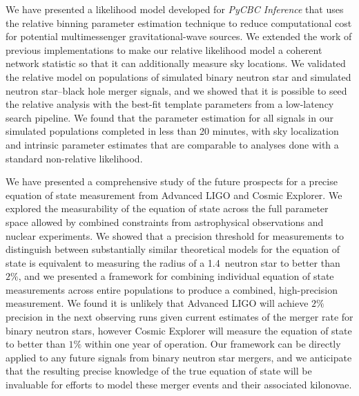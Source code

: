 We have presented a likelihood model developed for \textit{PyCBC Inference} that uses the relative binning parameter estimation technique to reduce computational cost for potential multimessenger gravitational-wave sources. We extended the work of previous implementations to make our relative likelihood model a coherent network statistic so that it can additionally measure sky locations. We validated the relative model on populations of simulated binary neutron star and simulated neutron star--black hole merger signals, and we showed that it is possible to seed the relative analysis with the best-fit template parameters from a low-latency search pipeline. We found that the parameter estimation for all signals in our simulated populations completed in less than 20 minutes, with sky localization and intrinsic parameter estimates that are comparable to analyses done with a standard non-relative likelihood.

We have presented a comprehensive study of the future prospects for a precise equation of state measurement from Advanced LIGO and Cosmic Explorer. We explored the measurability of the equation of state across the full parameter space allowed by combined constraints from astrophysical observations and nuclear experiments. We showed that a precision threshold for measurements to distinguish between substantially similar theoretical models for the equation of state is equivalent to measuring the radius of a 1.4\msun\ neutron star to better than $2\%$, and we presented a framework for combining individual equation of state measurements across entire populations to produce a combined, high-precision measurement. We found it is unlikely that Advanced LIGO will achieve $2\%$ precision in the next observing runs given current estimates of the merger rate for binary neutron stars, however Cosmic Explorer will measure the equation of state to better than $1\%$ within one year of operation. Our framework can be directly applied to any future signals from binary neutron star mergers, and we anticipate that the resulting precise knowledge of the true equation of state will be invaluable for efforts to model these merger events and their associated kilonovae.